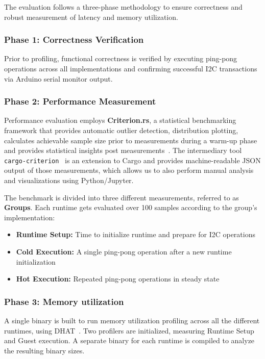 The evaluation follows a three-phase methodology to ensure correctness and robust measurement of latency and memory utilization.

\subsubsection{Phase 1: Correctness Verification}
Prior to profiling, functional correctness is verified by executing ping-pong operations across all implementations and confirming successful I2C transactions via Arduino serial monitor output.

\subsubsection{Phase 2: Performance Measurement}
Performance evaluation employs \textbf{Criterion.rs}, a statistical benchmarking framework that provides automatic outlier detection, distribution plotting, calculates achievable sample size prior to measurements during a warm-up phase and provides statistical insights post measurements~\cite{criterion_docs}. The intermediary tool \texttt{cargo-criterion}~\cite{cargo_criterion_docs} is an extension to Cargo and provides machine-readable JSON output of those measurements, which allows us to also perform manual analysis and visualizations using Python/Jupyter.

The benchmark is divided into three different measurements, referred to as \textbf{Groups}. Each runtime gets evaluated over 100 samples according to the group's implementation:
\begin{itemize}
    \item \textbf{Runtime Setup:} Time to initialize runtime and prepare for I2C operations
    \item \textbf{Cold Execution:} A single ping-pong operation after a new runtime initialization
    \item \textbf{Hot Execution:} Repeated ping-pong operations in steady state
\end{itemize}

\subsubsection{Phase 3: Memory utilization}
A single binary is built to run memory utilization profiling across all the different runtimes, using DHAT~\cite{dhat_crate}. Two profilers are initialized, measuring Runtime Setup and Guest execution. A separate binary for each runtime is compiled to analyze the resulting binary sizes.

